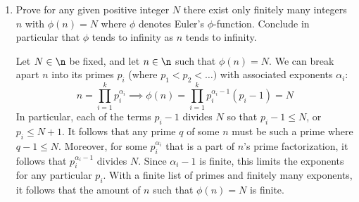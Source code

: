 \begin{enumerate}
\begin{breakablealgorithm}
\begin{algorithmic}[1]
            
                \EndWhile
            \EndWhile
            
        \end{algorithmic}
    \end{breakablealgorithm}
    \item Prove for any given positive integer $N$ there exist only finitely many integers $n$ with $\phi(n) = N$ where $\phi$ denotes Euler's $\phi$-function. Conclude in particular that $\phi$ tends to infinity as $n$ tends to infinity.
    \begin{sol}
        Let $N \in \n$ be fixed, and let $n \in \n$ such that $\phi(n) = N$. We can break apart $n$ into its primes $p_i$ (where $p_1 < p_2 < \dots)$ with associated exponents $\alpha_i$:
        $$n = \prod_{i = 1}^k p_i^{\alpha_i} \implies \phi(n) = \prod_{i = 1}^k p_i^{\alpha_i - 1}(p_i - 1) = N$$
        In particular, each of the terms $p_i - 1$ divides $N$ so that $p_i - 1 \leq N$, or $p_i \leq N + 1$. It follows that any prime $q$ of some $n$ must be such a prime where $q - 1 \leq N$. Moreover, for some $p_i^{\alpha_i}$ that is a part of $n$'s prime factorization, it follows that $p_i^{\alpha_i - 1}$ divides $N$. Since $\alpha_i - 1$ is finite, this limits the exponents for any particular $p_i$. With a finite list of primes and finitely many exponents, it follows that the amount of $n$ such that $\phi(n) = N$ is finite.
        

\end{sol}
\end{enumerate}
